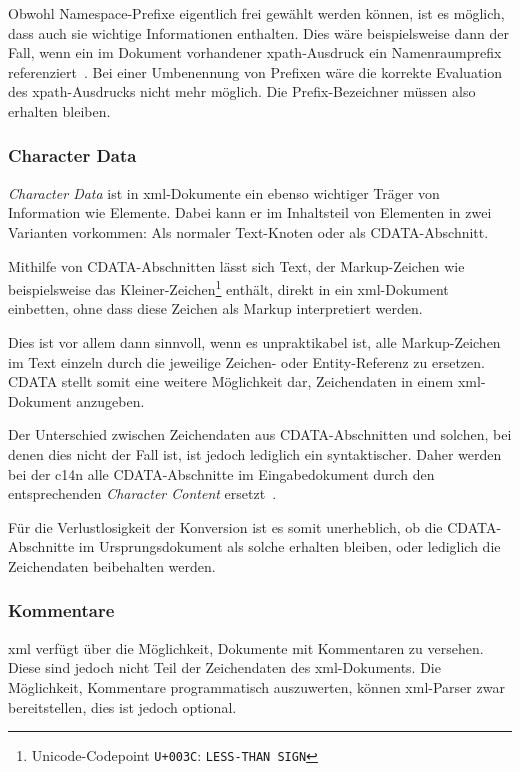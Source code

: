 Obwohl Namespace\hyp{}Prefixe eigentlich frei gewählt werden können, ist es möglich, dass auch sie wichtige Informationen enthalten. Dies wäre beispielsweise dann der Fall, wenn ein im Dokument vorhandener \acrshort{xpath}\hyp{}Ausdruck ein Namenraumprefix referenziert~\cite[Abschn. 4.4]{c14n}. Bei einer Umbenennung von Prefixen wäre die korrekte Evaluation des \acrshort{xpath}\hyp{}Ausdrucks nicht mehr möglich. Die Prefix-Bezeichner müssen also erhalten bleiben.

\subsubsection{Character Data}
\label{sec:cdata}

\emph{Character Data} ist in \acrshort{xml}-Dokumente ein ebenso wichtiger Träger von Information wie Elemente. Dabei kann er im Inhaltsteil von Elementen in zwei Varianten vorkommen: Als normaler Text-Knoten oder als CDATA\hyp{}Abschnitt.

Mithilfe von CDATA\hyp{}Abschnitten lässt sich Text, der Markup-Zeichen wie beispielsweise das Kleiner-Zeichen\footnote{Unicode-Codepoint \texttt{U+003C}: \texttt{LESS-THAN SIGN}} enthält, direkt in ein \acrshort{xml}-Dokument einbetten, ohne dass diese Zeichen als Markup interpretiert werden.

Dies ist vor allem dann sinnvoll, wenn es unpraktikabel ist, alle Markup-Zeichen im Text einzeln durch die jeweilige Zeichen- oder Entity-Referenz zu ersetzen. CDATA stellt somit eine weitere Möglichkeit dar, Zeichendaten in einem \acrshort{xml}-Dokument anzugeben.~\cite[Abschn.~2.4]{xml}

Der Unterschied zwischen Zeichendaten aus CDATA\hyp{}Abschnitten und solchen, bei denen dies nicht der Fall ist, ist jedoch lediglich ein syntaktischer. Daher werden bei der \acrlong{c14n} alle CDATA\hyp{}Abschnitte im Eingabedokument durch den entsprechenden \emph{Character Content} ersetzt~\cite[Abschn.~2.1]{c14n}.

Für die Verlustlosigkeit der Konversion ist es somit unerheblich, ob die CDATA\hyp{}Abschnitte im Ursprungsdokument als solche erhalten bleiben, oder lediglich die Zeichendaten beibehalten werden.

\subsubsection{Kommentare}

\acrshort{xml} verfügt über die Möglichkeit, Dokumente mit Kommentaren zu versehen. Diese sind jedoch nicht Teil der Zeichendaten des \acrshort{xml}-Dokuments. Die Möglichkeit, Kommentare programmatisch auszuwerten, können \acrshort{xml}-Parser zwar bereitstellen, dies ist jedoch optional.

